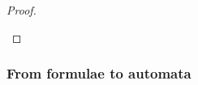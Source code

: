 \begin{proof}
\begin{enumerate}[(i)]
\begin{comment}
         \item At round $z_{n+1}$ a basic position of the form $(Q,t) \in \shA \times T$ is visited. The valuation suggested by $f$ makes the disjunct $\bigwedge_{a \in \Ran(R)} \Delta(a,\V(t))$ of $\Delta^{\noet}(Q,\V(t))$ true in $\R{t}$. \label{point:initialsegm}
         \item For all the next rounds $z_{n+2},z_{n+3},\dots$ only positions of the form $(a,s) \in A \times T$ are visited.
       \end{enumerate}
       In each round of the initial segment $z_0,z_1,\dots,z_n$ we can maintain the condition that, if a position $(R,s)$ is visited in $\pi$, then at the same round a position $(a,s)$ with $a \in \Ran(R)$ occurs in $\pi'$. This holds for the initial round $z_0$. For the next ones $z_1,\dots,z_n$, it can be enforced by defining $f'$ in terms of $f$ in the standard way shown, for instance, in the proof of \cite[Prop. 3.9]{Zanasi:Thesis:2012}.
       \fzwarning{More details to be provided}
       Once $\pi$ reaches round $z_n$, say with position $(Q,t)$, the valuation suggested by $f$ makes $\bigwedge_{a \in \Ran(R)} \Delta(a,\V(t))$ true in $\R{t}$ ({\it cf.} point \eqref{point:initialsegm}). By assumption, at round $z_n$, $\pi'$ visits a position $(b,t)$ with $b \in \Ran(Q)$. Then in particular the valuation suggested by $f$ makes $\Delta(b,\V(t))$ true, and we let it be the suggestion of $f'$ at that stage. By definition of $\Delta^{\noet}$, from the next round onwards we can maintain the same basic positions in $\pi$ and $\pi'$, and let $f'$ just be defined as $f$. As $\exists$ wins $\pi$, it will also win the match $\pi'$, meaning that $f'$ is a winning strategy.
       \end{comment}
\end{enumerate}
\end{proof}

\subsubsection{From formulae to automata}

